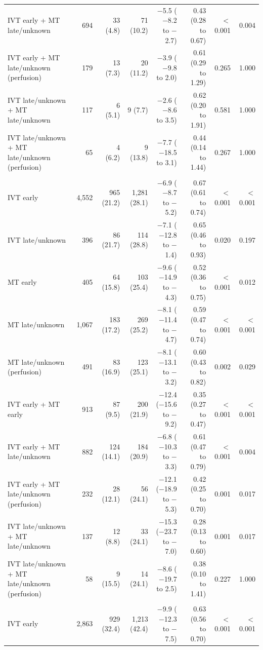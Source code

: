 \begin{landscape}
\begin{longtable}{p{5.6cm}rrrrrrr}
IVT early + MT late/unknown & 694 & 33 (4.8) & 71 (10.2) & $-$5.5 ($-$8.2 to $-$2.7) & 0.43 (0.28 to 0.67) & $<$0.001 & 0.004 \\
IVT early + MT late/unknown (perfusion) & 179 & 13 (7.3) & 20 (11.2) & $-$3.9 ($-$9.8 to 2.0) & 0.61 (0.29 to 1.29) & 0.265 & 1.000 \\
IVT late/unknown + MT late/unknown & 117 & 6 (5.1) & 9 (7.7) & $-$2.6 ($-$8.6 to 3.5) & 0.62 (0.20 to 1.91) & 0.581 & 1.000 \\
IVT late/unknown + MT late/unknown (perfusion) & 65 & 4 (6.2) & 9 (13.8) & $-$7.7 ($-$18.5 to 3.1) & 0.44 (0.14 to 1.44) & 0.267 & 1.000 \\
\addlinespace
\multicolumn{8}{l}{\textbf{NIHSS 16--20}}\\
IVT early & 4,552 & 965 (21.2) & 1,281 (28.1) & $-$6.9 ($-$8.7 to $-$5.2) & 0.67 (0.61 to 0.74) & $<$0.001 & $<$0.001 \\
IVT late/unknown & 396 & 86 (21.7) & 114 (28.8) & $-$7.1 ($-$12.8 to $-$1.4) & 0.65 (0.46 to 0.93) & 0.020 & 0.197 \\
MT early & 405 & 64 (15.8) & 103 (25.4) & $-$9.6 ($-$14.9 to $-$4.3) & 0.52 (0.36 to 0.75) & $<$0.001 & 0.012 \\
MT late/unknown & 1,067 & 183 (17.2) & 269 (25.2) & $-$8.1 ($-$11.4 to $-$4.7) & 0.59 (0.47 to 0.74) & $<$0.001 & $<$0.001 \\
MT late/unknown (perfusion) & 491 & 83 (16.9) & 123 (25.1) & $-$8.1 ($-$13.1 to $-$3.2) & 0.60 (0.43 to 0.82) & 0.002 & 0.029 \\
IVT early + MT early & 913 & 87 (9.5) & 200 (21.9) & $-$12.4 ($-$15.6 to $-$9.2) & 0.35 (0.27 to 0.47) & $<$0.001 & $<$0.001 \\
IVT early + MT late/unknown & 882 & 124 (14.1) & 184 (20.9) & $-$6.8 ($-$10.3 to $-$3.3) & 0.61 (0.47 to 0.79) & $<$0.001 & 0.004 \\
IVT early + MT late/unknown (perfusion) & 232 & 28 (12.1) & 56 (24.1) & $-$12.1 ($-$18.9 to $-$5.3) & 0.42 (0.25 to 0.70) & 0.001 & 0.017 \\
IVT late/unknown + MT late/unknown & 137 & 12 (8.8) & 33 (24.1) & $-$15.3 ($-$23.7 to $-$7.0) & 0.28 (0.13 to 0.60) & 0.001 & 0.017 \\
IVT late/unknown + MT late/unknown (perfusion) & 58 & 9 (15.5) & 14 (24.1) & $-$8.6 ($-$19.7 to 2.5) & 0.38 (0.10 to 1.41) & 0.227 & 1.000 \\
\addlinespace
\multicolumn{8}{l}{\textbf{NIHSS 21--25}}\\
IVT early & 2,863 & 929 (32.4) & 1,213 (42.4) & $-$9.9 ($-$12.3 to $-$7.5) & 0.63 (0.56 to 0.70) & $<$0.001 & $<$0.001 \\

\end{longtable}
\end{landscape}
